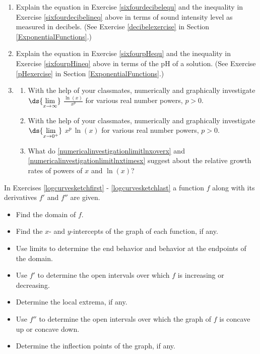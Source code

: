 \documentclass{ximera}
\begin{document}
\begin{enumerate}
\item Explain the equation in Exercise \ref{sixfourdecibelequ} and the inequality in Exercise \ref{sixfourdecibelineq} above in terms of sound intensity level as measured in decibels.  (See Exercise \ref{decibelexercise} in Section \ref{ExponentialFunctions}.)

\item Explain the equation in Exercise \ref{sixfourpHequ} and the inequality in Exercise \ref{sixfourpHineq} above in terms of the pH of a solution.  (See Exercise \ref{pHexercise} in Section \ref{ExponentialFunctions}.)

\item \label{powerloggrowthex} \begin{enumerate} \item\label{numericalinvestigationlimitlnxoverx} With the help of your classmates, numerically and graphically investigate $\ds{\lim_{x \rightarrow \infty}}$ $\frac{\ln(x)}{x^{p}}$ for various real number powers, $p > 0$.

 \item\label{numericalinvestigationlimitlnxtimesx} With the help of your classmates, numerically and graphically investigate $\ds{\lim_{x \rightarrow 0^{+}}}$ $x^{p} \, \ln(x) $ for various real number powers, $p > 0$.

\item  What do \ref{numericalinvestigationlimitlnxoverx} and \ref{numericalinvestigationlimitlnxtimesx} suggest about the relative growth rates of powers of $x$ and $\ln(x)$?

\end{enumerate}  

\setcounter{HW}{\value{enumi}}
\end{enumerate}

In Exercises \ref{logcurvesketchfirst}  - \ref{logcurvesketchlast} a function $f$ along with its derivatives $f'$ and $f''$ are given.

\begin{itemize}

\item  Find the domain of $f$.

\item  Find the $x$- and $y$-intercepts of the graph of each function, if any.

\item  Use limits to determine the end behavior and behavior at the endpoints of the domain.

\item  Use $f'$ to determine the open intervals over which $f$ is increasing or decreasing.

\item Determine the local extrema, if any.

\item  Use $f''$ to determine the open intervals over which the graph of $f$  is concave up or concave down.

\item  Determine the inflection points of the graph, if any.

\end{itemize}
\end{document}
